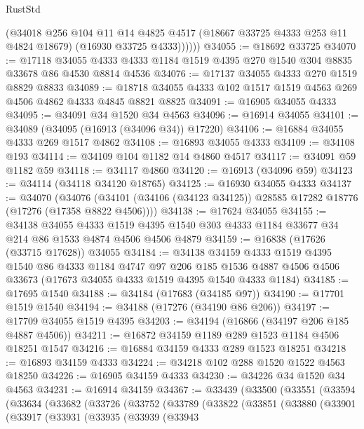 \begin{lexlean}{RustStd}
\begin{coremodule}
            (@34018
              @256
              @104
              @11
              @14
              @4825
              @4517
              (@18667 @33725 @4333 @253 @11 @4824 @18679)
              (@16930 @33725 @4333))))))
@34055 := @18692 @33725
@34070 := @17118
    @34055
    @4333
    @4333
    @1184
    @1519
    @4395
    @270
    @1540
    @304
    @8835
    @33678
    @86
    @4530
    @8814
    @4536
@34076 := @17137 @34055 @4333 @270 @1519 @8829 @8833
@34089 := @18718 @34055 @4333 @102 @1517 @1519 @4563 @269 @4506 @4862 @4333 @4845 @8821 @8825
@34091 := @16905 @34055 @4333
@34095 := @34091 @34 @1520 @34 @4563
@34096 := @16914 @34055
@34101 := @34089 (@34095 (@16913 (@34096 @34)) @17220)
@34106 := @16884 @34055 @4333 @269 @1517 @4862
@34108 := @16893 @34055 @4333
@34109 := @34108 @193
@34114 := @34109 @104 @1182 @14 @4860 @4517
@34117 := @34091 @59 @1182 @59
@34118 := @34117 @4860
@34120 := @16913 (@34096 @59)
@34123 := @34114 (@34118 @34120 @18765)
@34125 := @16930 @34055 @4333
@34137 := @34070
    (@34076 (@34101 (@34106 (@34123 @34125)) @28585 @17282 @18776 (@17276 (@17358 @8822 @4506))))
@34138 := @17624 @34055
@34155 := @34138
    @34055
    @4333
    @1519
    @4395
    @1540
    @303
    @4333
    @1184
    @33677
    @34
    @214
    @86
    @1533
    @4874
    @4506
    @4506
    @4879
@34159 := @16838 (@17626 (@33715 @17628)) @34055
@34184 := @34138
    @34159
    @4333
    @1519
    @4395
    @1540
    @86
    @4333
    @1184
    @4747
    @97
    @206
    @185
    @1536
    @4887
    @4506
    @4506
    @33673
    (@17673 @34055 @4333 @1519 @4395 @1540 @4333 @1184)
@34185 := @17695 @1540
@34188 := @34184 (@17683 (@34185 @97))
@34190 := @17701 @1519 @1540
@34194 := @34188 (@17276 (@34190 @86 @206))
@34197 := @17709 @34055 @1519 @4395
@34203 := @34194 (@16866 (@34197 @206 @185 @4887 @4506))
@34211 := @16872 @34159 @1189 @289 @1523 @1184 @4506 @18251 @1547
@34216 := @16884 @34159 @4333 @289 @1523 @18251
@34218 := @16893 @34159 @4333
@34224 := @34218 @102 @288 @1520 @1522 @4563 @18250
@34226 := @16905 @34159 @4333
@34230 := @34226 @34 @1520 @34 @4563
@34231 := @16914 @34159
@34367 := @33439
    (@33500
      (@33551
        (@33594
          (@33634
            (@33682
              (@33726
                (@33752
                  (@33789
                    (@33822
                      (@33851
                        (@33880
                          (@33901
                            (@33917
                              (@33931
                                (@33935
                                  (@33939
                                    (@33943

\end{coremodule}
\end{lexlean}
